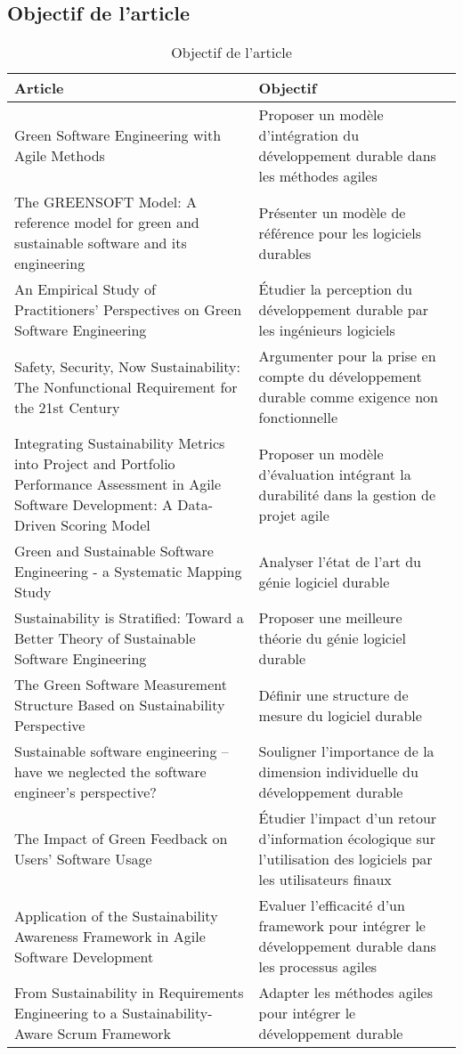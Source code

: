 \subsection{Objectif de l'article}

\begin{table}[htb]
    \small
    \renewcommand{\arraystretch}{1.5}
    \begin{tabularx}{\textwidth}{|X|X|}
        \hline
        \textbf{Article} & \textbf{Objectif} \\ 
        \hline
        Green Software Engineering with Agile Methods & Proposer un modèle d'intégration du développement durable dans les méthodes agiles \\ \hline
        The GREENSOFT Model: A reference model for green and sustainable software and its engineering & Présenter un modèle de référence pour les logiciels durables \\ \hline
        An Empirical Study of Practitioners’ Perspectives on Green Software Engineering & Étudier la perception du développement durable par les ingénieurs logiciels \\ \hline
        Safety, Security, Now Sustainability: The Nonfunctional Requirement for the 21st Century & Argumenter pour la prise en compte du développement durable comme exigence non fonctionnelle \\ \hline
        Integrating Sustainability Metrics into Project and Portfolio Performance Assessment in Agile Software Development: A Data-Driven Scoring Model & Proposer un modèle d'évaluation intégrant la durabilité dans la gestion de projet agile \\ \hline
        Green and Sustainable Software Engineering - a Systematic Mapping Study & Analyser l'état de l'art du génie logiciel durable \\ \hline
        Sustainability is Stratified: Toward a Better Theory of Sustainable Software Engineering & Proposer une meilleure théorie du génie logiciel durable \\ \hline
        The Green Software Measurement Structure Based on Sustainability Perspective & Définir une structure de mesure du logiciel durable \\ \hline
        Sustainable software engineering – have we neglected the software engineer’s perspective? & Souligner l'importance de la dimension individuelle du développement durable \\ \hline
        The Impact of Green Feedback on Users’ Software Usage & Étudier l'impact d'un retour d'information écologique sur l'utilisation des logiciels par les utilisateurs finaux \\
        \hline
        Application of the Sustainability Awareness Framework in Agile Software Development & Evaluer l'efficacité d'un framework pour intégrer le développement durable dans les processus agiles \\ \hline
        From Sustainability in Requirements Engineering to a Sustainability-Aware Scrum Framework & Adapter les méthodes agiles pour intégrer le développement durable \\ \hline
    \end{tabularx}
    \caption{Objectif de l'article}
\end{table}

